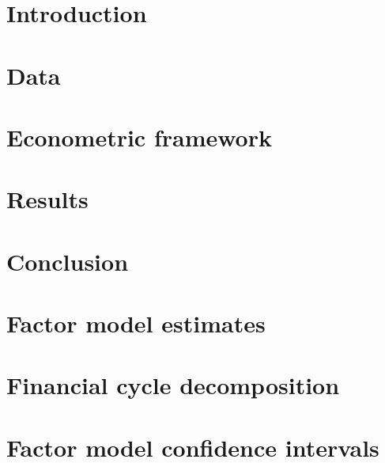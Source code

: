 \documentclass[a4paper, notitlepage,12pt]{article}
\begin{document}
\newpage

\section{Introduction \label{Intro}}
\section{Data}
\section{Econometric framework}
\section{Results}
\section{Conclusion}

\newpage




\newpage

\appendix 
\section{Factor model estimates \label{AppendixA}}
\section{Financial cycle decomposition \label{AppendixB}}
\section{Factor model confidence intervals \label{AppendixC}}
\end{document}

